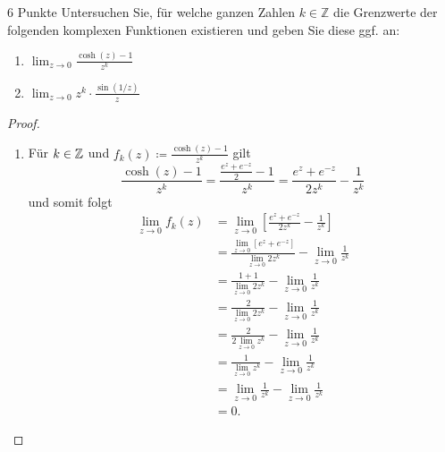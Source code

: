 \documentclass{problemset}
\begin{document}
\begin{problem}[Grenzwerte]{6 Punkte}
Untersuchen Sie, für welche ganzen Zahlen $k \in \mathbb{Z}$ die Grenzwerte der folgenden komplexen Funktionen existieren und geben Sie diese ggf. an:

\begin{enumerate}
    \item $\lim_{z \to 0} \frac{\cosh(z) - 1}{z^k}$

    \item $\lim_{z \to 0} z^k \cdot \frac{\sin(1/z)}{z}$
\end{enumerate}

\begin{proof}
    \leavevmode
    \begin{enumerate}
        \item Für $k \in \mathbb{Z}$ und $f_k(z) \coloneqq \frac{\cosh(z) - 1}{z^k}$
              gilt \[
                  \frac{\cosh(z) - 1}{z^k} = \frac{\frac{e^z + e^{-z}}{2} - 1}{z^k} = \frac{e^z + e^{-z}}{2z^k} - \frac{1}{z^k}
              \] und somit folgt
              \begin{align*}
                  \lim_{z \to 0} f_k(z) & = \lim_{z \to 0} \left[ \frac{e^z + e^{-z}}{2z^k} - \frac{1}{z^k} \right]                               \\
                                        & = \frac{\lim_{z \to 0} \left[ e^z + e^{-z} \right]}{\lim_{z \to 0} 2z^k} - \lim_{z \to 0} \frac{1}{z^k} \\
                                        & = \frac{1 + 1}{\lim_{z \to 0} 2z^k} - \lim_{z \to 0} \frac{1}{z^k}                                      \\
                                        & = \frac{2}{\lim_{z \to 0} 2z^k} - \lim_{z \to 0} \frac{1}{z^k}                                          \\
                                        & = \frac{2}{2 \lim_{z \to 0} z^k} - \lim_{z \to 0} \frac{1}{z^k}                                         \\
                                        & = \frac{1}{\lim_{z \to 0} z^k} - \lim_{z \to 0} \frac{1}{z^k}                                           \\
                                        & = \lim_{z \to 0} \frac{1}{z^k} - \lim_{z \to 0} \frac{1}{z^k}                                           \\
                                        & = 0.
              \end{align*}


\end{enumerate}
\end{proof}
\end{problem}
\end{document}
